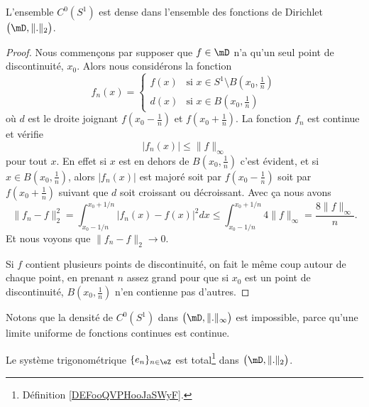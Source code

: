 \begin{lemma}   \label{LemVIwMsTC}
	L'ensemble \( C^0(S^1)\) est dense dans l'ensemble des fonctions de Dirichlet \( \big( \mD,\| . \|_2 \big)\).
\end{lemma}

\begin{proof}
	Nous commençons par supposer que \( f\in\mD\) n'a qu'un seul point de discontinuité, \( x_0\). Alors nous considérons la fonction
	\begin{equation}
		f_n(x)=\begin{cases}
			f(x) & \text{si } x\in S^1\setminus B(x_0,\frac{1}{ n }) \\
			d(x) & \text{si }x\in B(x_0,\frac{1}{ n })
		\end{cases}
	\end{equation}
	où \( d\) est le droite joignant \( f(x_0-\frac{1}{ n })\) et \( f(x_0+\frac{1}{ n })\). La fonction \( f_n\) est continue et vérifie
	\begin{equation}
		| f_n(x) |\leq \| f \|_{\infty}
	\end{equation}
	pour tout \( x\). En effet si \( x\) est en dehors de \( B(x_0,\frac{1}{ n })\) c'est évident, et si \( x\in B(x_0,\frac{1}{ n })\), alors \( | f_n(x) |\) est majoré soit par \( f(x_0-\frac{1}{ n })\) soit par \( f(x_0+\frac{1}{ n })\) suivant que \( d\) soit croissant ou décroissant. Avec ça nous avons
	\begin{equation}
		\| f_n-f \|_2^2=\int_{x_0-1/n}^{x_0+1/n}| f_n(x)-f(x) |^2dx\leq \int_{x_0-1/n}^{x_0+1/n}4\| f \|_{\infty}=\frac{ 8\| f \|_{\infty} }{ n }.
	\end{equation}
	Et nous voyons que \( \| f_n-f \|_2\to 0\).

	Si \( f\) contient plusieurs points de discontinuité, on fait le même coup autour de chaque point, en prenant \( n\) assez grand pour que si \( x_0\) est un point de discontinuité, \( B(x_0,\frac{1}{ n })\) n'en contienne pas d'autres.
\end{proof}

Notons que la densité de \( C^0(S^1)\) dans \( \big( \mD,\| . \|_{\infty} \big)\) est impossible, parce qu'une limite uniforme de fonctions continues est continue.

\begin{theorem}
	Le système trigonométrique \( \{ e_n \}_{n\in \eZ}\) est total\footnote{Définition \ref{DEFooQVPHooJaSWyF}.} dans \( \big( \mD,\| . \|_2 \big)\).
\end{theorem}

